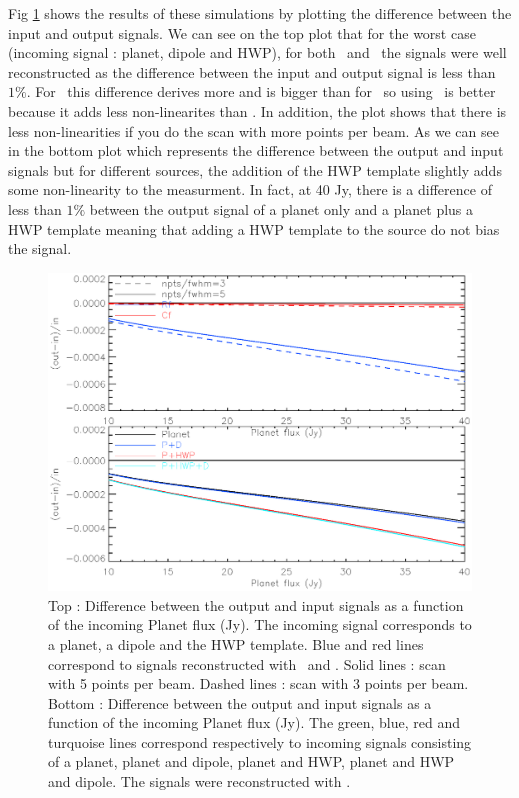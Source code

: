 Fig \ref{fig:diff-rf-cf} shows the results of these simulations by plotting the difference between the input and output signals. We can see on the top plot that for the worst case (incoming signal : planet, dipole and HWP), for both \rf\ and \cf\ the signals were well reconstructed as the difference between the input and output signal is less than $ 1 \%$. For \rf\ this difference derives more and is bigger than for \cf\, so using \cf\ is better because it adds less non-linearites than \rf . In addition, the plot shows that there is less non-linearities if you do the scan with more points per beam. As we can see in the bottom plot which represents the difference between the output and input signals but for different sources, the addition of the HWP template slightly adds some non-linearity to the measurment. In fact, at 40 Jy, there is a difference of less than $1 \%$ between the output signal of a planet only and a planet plus a HWP template meaning that adding a HWP template to the source do not bias the signal.

\begin{figure}[h]
\center
	\includegraphics[scale=0.5]{Figures/diff-rf-cf.eps}
	\caption{Top : Difference between the output and input signals as a function of the incoming Planet flux (Jy). The incoming signal corresponds to a planet, a dipole and the HWP template. Blue and red lines correspond to signals reconstructed with \rf\ and \cf. Solid lines : scan with 5 points per beam. Dashed lines : scan with 3 points per beam.
	Bottom : Difference between the output and input signals as a function of the incoming Planet flux (Jy). The green, blue, red and turquoise lines correspond respectively to incoming signals consisting of a planet, planet and dipole, planet and HWP, planet and HWP and dipole. The signals were reconstructed with \rf. }
	\label{fig:diff-rf-cf}
\end{figure}

